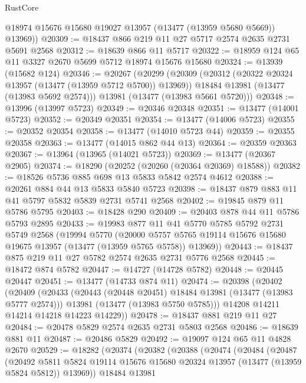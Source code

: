\begin{lexlean}{RustCore}
\begin{coremodule}
        @18974
        @15676
        @15680
        @19027
        @13957
        (@13477 (@13959 @5680 @5669))
        @13969))
@20309 := @18437 @866 @219 @11 @27 @5717 @2574 @2635 @2731 @5691 @2568
@20312 := @18639 @866 @11 @5717
@20322 := @18959 @124 @65 @11 @3327 @2670 @5699 @5712 @18974 @15676 @15680
@20324 := @13939 (@15682 @124)
@20346 := @20267
    (@20299
      (@20309
        (@20312 (@20322 @20324 @13957 (@13477 (@13959 @5712 @5700)) @13969))
        @18484
        @13981
        (@13477 (@13983 @5692 @2574)))
      @13981
      (@13477 (@13983 @5661 @5720)))
@20348 := @13996 (@13997 @5723)
@20349 := @20346 @20348
@20351 := @13477 (@14001 @5723)
@20352 := @20349 @20351
@20354 := @13477 (@14006 @5723)
@20355 := @20352 @20354
@20358 := @13477 (@14010 @5723 @44)
@20359 := @20355 @20358
@20363 := @13477 (@14015 @862 @44 @13)
@20364 := @20359 @20363
@20367 := @13964 (@13965 (@14021 @5723))
@20369 := @13477 (@20367 @2905)
@20374 := @18290 (@20252 (@20260 (@20364 @20369) @18588))
@20382 := @18526 @5736 @885 @698 @13 @5833 @5842 @2574 @4612
@20388 := @20261 @884 @44 @13 @5833 @5840 @5723
@20398 := @18437 @879 @883 @11 @41 @5797 @5832 @5839 @2731 @5741 @2568
@20402 := @19845 @879 @11 @5786 @5795
@20403 := @18428 @290
@20409 := @20403 @878 @44 @11 @5786 @5793 @2895
@20433 := @19983
    @877
    @11
    @41
    @5770
    @5785
    @5792
    @2731
    @5749
    @2568
    (@19994
      @5770
      (@20000 @5757 @5765 @19114 @15676 @15680 @19675 @13957 (@13477 (@13959 @5765 @5758)) @13969))
@20443 := @18437 @875 @219 @11 @27 @5782 @2574 @2635 @2731 @5776 @2568
@20445 := @18472 @874 @5782
@20447 := @14727 (@14728 @5782)
@20448 := @20445 @20447
@20451 := @13477 (@14733 @874 @11)
@20474 := @20398
    (@20402
      (@20409
        (@20433
          (@20443 (@20448 @20451) @18484 @13981 (@13477 (@13983 @5777 @2574)))
          @13981
          (@13477 (@13983 @5750 @5785)))
        @14208
        @14211
        @14214
        @14218
        @14223
        @14229))
@20478 := @18437 @881 @219 @11 @27
@20484 := @20478 @5829 @2574 @2635 @2731 @5803 @2568
@20486 := @18639 @881 @11
@20487 := @20486 @5829
@20492 := @19097 @124 @65 @11 @4828 @2670
@20529 := @18282
    (@20374
      (@20382
        (@20388
          (@20474
            (@20484
              (@20487
                (@20492
                  @5811
                  @5824
                  @19114
                  @15676
                  @15680
                  @20324
                  @13957
                  (@13477 (@13959 @5824 @5812))
                  @13969))
              @18484
              @13981

\end{coremodule}
\end{lexlean}
